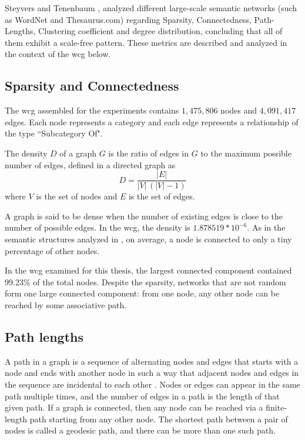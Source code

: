 Steyvers and Tenenbaum \cite{steyvers2005large}, analyzed different large-scale semantic networks (such as WordNet \cite{miller1998wordnet} and Thesaurus.com) regarding Sparsity, Connectedness, Path-Lengths, Clustering coefficient and degree distribution, concluding that all of them exhibit a scale-free pattern. These metrics are described and analyzed in the context of the \gls{wcg} below.




\subsection{\hspace*{3pt} Sparsity and Connectedness}

The \gls{wcg} assembled for the experiments contains $1,475,806$ nodes and $4,091,417$ edges. Each node
represents a category and each edge represents a relationship of the type ``Subcategory Of". 

The density $D$ of a graph $G$ is the ratio of edges in $G$ to the maximum possible number of edges, defined in a directed graph as  
\begin{equation}
D={\frac  {|E|}{|V|\,(|V|-1)}}
\end{equation} where $V$ is the set of nodes and $E$ is the set of edges.

A graph is said to be dense when the number of existing edges is close to the number of possible edges. In the \gls{wcg}, the density is $1.878519 * 10^{-6}$. As in the semantic structures analyzed in \cite{steyvers2005large}, on average, a node is connected to only a tiny percentage of other nodes. 

In the \gls{wcg} examined for this thesis, the largest connected component contained 99.23\% of the total nodes.
Despite the sparsity, networks that are not random form one large connected component: from one node, any other node can be reached by some associative path. 



\subsection{\hspace*{3pt} Path lengths}

A path in a graph is a sequence of alternating nodes and edges that starts with a node and ends with another node in such a way that adjacent nodes and edges in the sequence are incidental to each other \cite{newman2010networks}. Nodes or edges can appear in the same path multiple times, and the number of edges in a path is the length of that given path. If a graph is connected, then any node can be reached via a finite-length path starting from any other node. The shortest path between a pair of nodes is called a geodesic path, and there can be more than one such path.

